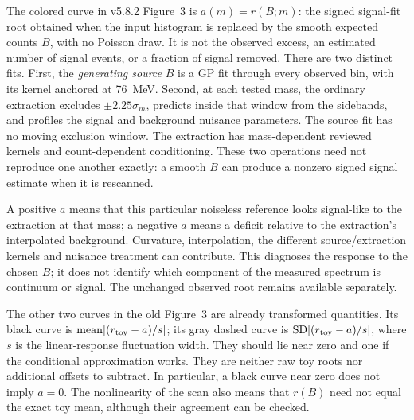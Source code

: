 \label{sec:physics-offset}
The colored curve in v5.8.2 Figure~3 is $a(m)=r(B;m)$: the signed signal-fit root obtained when the input histogram is replaced by the smooth expected counts $B$, with no Poisson draw. It is not the observed excess, an estimated number of signal events, or a fraction of signal removed. There are two distinct fits. First, the \emph{generating source} $B$ is a GP fit through every observed bin, with its kernel anchored at 76~MeV. Second, at each tested mass, the ordinary extraction excludes $\pm2.25\sigma_m$, predicts inside that window from the sidebands, and profiles the signal and background nuisance parameters. The source fit has no moving exclusion window. The extraction has mass-dependent reviewed kernels and count-dependent conditioning. These two operations need not reproduce one another exactly: a smooth $B$ can produce a nonzero signed signal estimate when it is rescanned.

A positive $a$ means that this particular noiseless reference looks signal-like to the extraction at that mass; a negative $a$ means a deficit relative to the extraction's interpolated background. Curvature, interpolation, the different source/extraction kernels and nuisance treatment can contribute. This diagnoses the response to the chosen $B$; it does not identify which component of the measured spectrum is continuum or signal. The unchanged observed root remains available separately.

The other two curves in the old Figure~3 are already transformed quantities. Its black curve is $\operatorname{mean}[(r_{\rm toy}-a)/s]$; its gray dashed curve is $\operatorname{SD}[(r_{\rm toy}-a)/s]$, where $s$ is the linear-response fluctuation width. They should lie near zero and one if the conditional approximation works. They are neither raw toy roots nor additional offsets to subtract. In particular, a black curve near zero does not imply $a=0$. The nonlinearity of the scan also means that $r(B)$ need not equal the exact toy mean, although their agreement can be checked.


